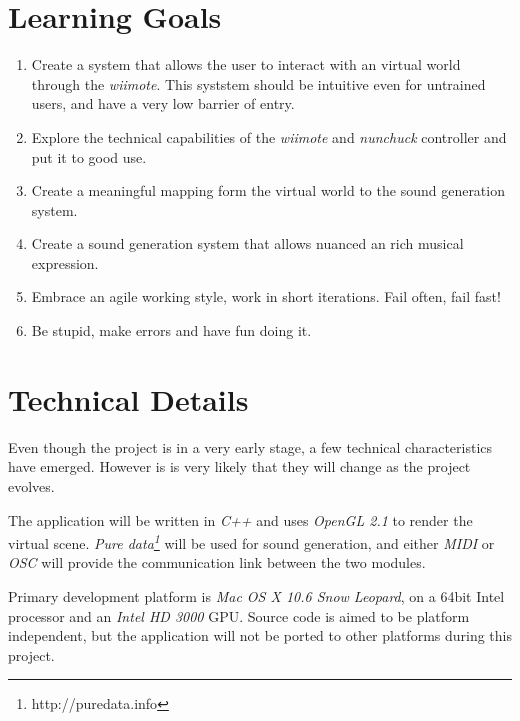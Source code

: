 \documentclass[10pt,a4paper]{scrartcl}
\begin{document}
\section{Learning Goals}
\begin{enumerate}
\item Create a system that allows the user to interact with an virtual world through the \emph{wiimote}. This syststem should be intuitive even for untrained users, and have a very low barrier of entry.
\item Explore the technical capabilities of the \emph{wiimote} and \emph{nunchuck} controller and put it to good use.
\item Create a meaningful mapping form the virtual world to the sound generation system.
\item Create a sound generation system that allows nuanced an rich musical expression.
\item Embrace an agile working style, work in short iterations. Fail often, fail fast!
\item Be stupid, make errors and have fun doing it.
\end{enumerate}

\section{Technical Details}
Even though the project is in a very early stage, a few technical characteristics have emerged. However is is very likely that they will change as the project evolves.

The application will be written in \emph{C++} and uses \emph{OpenGL 2.1} to render the virtual scene. \emph{Pure data\footnote{http://puredata.info}} will be used for sound generation, and either \emph{MIDI} or \emph{OSC} will provide the communication link between the two modules.

Primary development platform is \emph{Mac OS X 10.6 Snow Leopard}, on a 64bit Intel processor and an \emph{Intel HD 3000} GPU. Source code is aimed to be platform independent, but the application will not be ported to other platforms during this project. 

\nocite{*}



\end{document}
